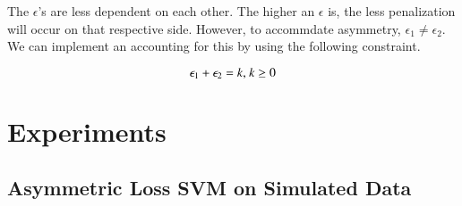 The $\epsilon$'s are less dependent on each other. The higher an $\epsilon$ is, the less penalization will occur on that respective side. However, to accommdate asymmetry, $\epsilon_1 \neq \epsilon_2$. We can implement an accounting for this by using the following constraint.

\begin{equation}\label{epsilon constraint}
\epsilon_1 + \epsilon_2=k \\
\text{, } k \geq 0
\end{equation}

\section{Experiments}
\subsection{Asymmetric Loss SVM on Simulated Data}\label{simulation}
